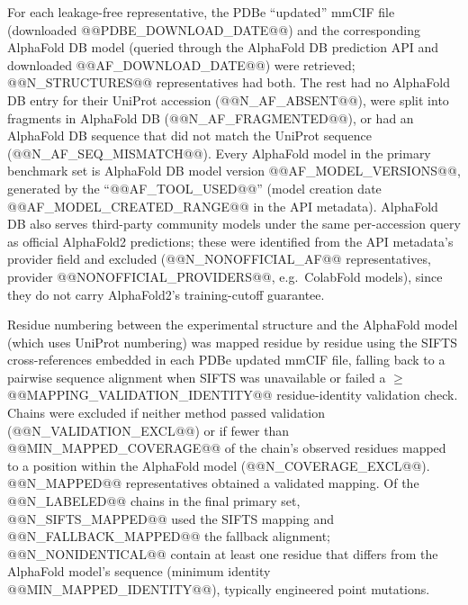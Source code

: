 \documentclass[10pt]{article}
\begin{document}
For each leakage-free representative, the PDBe ``updated'' mmCIF file
(downloaded @@PDBE_DOWNLOAD_DATE@@) and the corresponding AlphaFold DB model
(queried through the AlphaFold DB prediction API and downloaded
@@AF_DOWNLOAD_DATE@@) were retrieved; @@N_STRUCTURES@@ representatives had
both. The rest had no AlphaFold DB entry for their UniProt accession
(@@N_AF_ABSENT@@), were split into fragments in AlphaFold DB
(@@N_AF_FRAGMENTED@@), or had an AlphaFold DB sequence that did not match
the UniProt sequence (@@N_AF_SEQ_MISMATCH@@). Every AlphaFold model in the
primary benchmark set is AlphaFold DB model version @@AF_MODEL_VERSIONS@@,
generated by the ``@@AF_TOOL_USED@@'' (model creation date
@@AF_MODEL_CREATED_RANGE@@ in the API metadata). AlphaFold DB also serves
third-party community models under the same per-accession query as official
AlphaFold2 predictions; these were identified from the API metadata's
provider field and excluded (@@N_NONOFFICIAL_AF@@ representatives, provider
@@NONOFFICIAL_PROVIDERS@@, e.g.\ ColabFold models), since they do not carry
AlphaFold2's training-cutoff guarantee.

Residue numbering between the experimental structure and the AlphaFold model
(which uses UniProt numbering) was mapped residue by residue using the SIFTS
cross-references embedded in each PDBe updated mmCIF file, falling back to a
pairwise sequence alignment when SIFTS was unavailable or failed a
$\geq$@@MAPPING_VALIDATION_IDENTITY@@ residue-identity validation check.
Chains were excluded if neither method passed validation
(@@N_VALIDATION_EXCL@@) or if fewer than @@MIN_MAPPED_COVERAGE@@ of the
chain's observed residues mapped to a position within the AlphaFold model
(@@N_COVERAGE_EXCL@@). @@N_MAPPED@@ representatives obtained a validated
mapping. Of the @@N_LABELED@@ chains in the final primary set,
@@N_SIFTS_MAPPED@@ used the SIFTS mapping and @@N_FALLBACK_MAPPED@@ the
fallback alignment; @@N_NONIDENTICAL@@ contain at least one residue that
differs from the AlphaFold model's sequence (minimum identity
@@MIN_MAPPED_IDENTITY@@), typically engineered point mutations.
\end{document}
